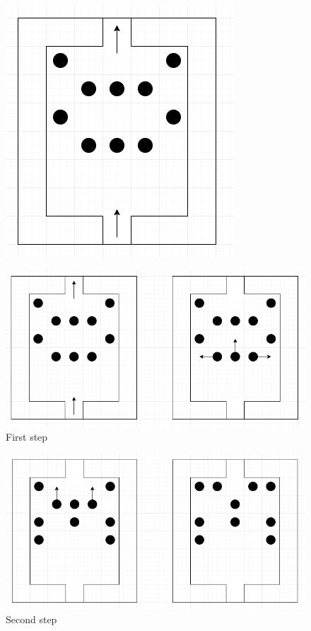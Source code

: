 \begin{figure}[H]
	\centering
	\includegraphics[width=0.7\linewidth]{images/puzzle/puzzle_021.png}
\end{figure}

\begin{figure}[H]
	\centering
	\includegraphics[width=0.8\linewidth]{images/puzzle/puzzle_022.png}
	\caption*{First step}
\end{figure}

\begin{figure}[H]
	\centering
	\includegraphics[width=0.8\linewidth]{images/puzzle/puzzle_023.png}
	\caption*{Second step}
\end{figure}

